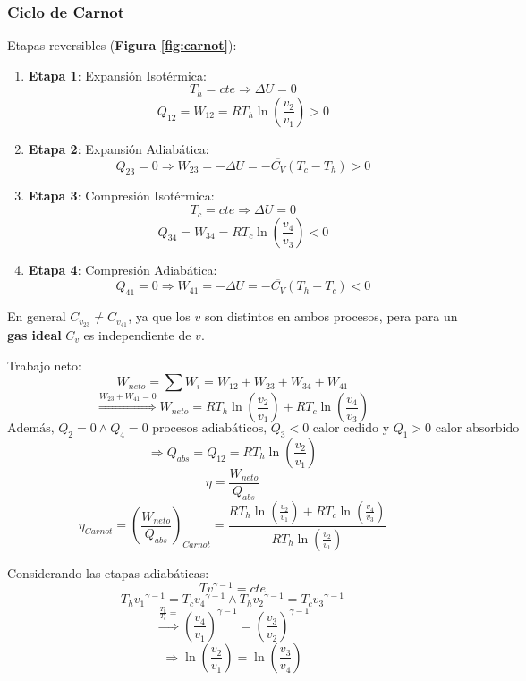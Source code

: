         \subsubsection{Ciclo de Carnot}
        
        Etapas reversibles (\textbf{Figura \ref{fig:carnot}}):
        
        \begin{enumerate}
            \item \textbf{Etapa 1}: Expansión Isotérmica:
                \[T_{h}=cte \Rightarrow \Delta U = 0\]
                \[Q_{12}=W_{12}=RT_{h} \ln(\frac{v_{2}}{v_{1}})>0\]
            \item \textbf{Etapa 2}: Expansión Adiabática:
                \[Q_{23}=0 \Rightarrow W_{23}=-\Delta U=-\overline{C_{V}}(T_{c}-T_{h})>0\]
            \item \textbf{Etapa 3}: Compresión Isotérmica:
                \[T_{c}=cte \Rightarrow \Delta U = 0\]
                \[Q_{34}=W_{34}=RT_{c} \ln(\frac{v_{4}}{v_{3}})<0\]
            \item \textbf{Etapa 4}: Compresión Adiabática:
                \[Q_{41}=0 \Rightarrow W_{41}=-\Delta U=-\overline{C_{V}}(T_{h}-T_{c})<0\]
        \end{enumerate}
        
        En general \(C_{v_{23}} \neq C_{v_{41}}\), ya que los \(v\) son distintos en ambos procesos, pera para un \textbf{gas ideal} \(C_{v}\) es independiente de \(v\).
        
        Trabajo neto:
        \[W_{neto}=\sum W_{i}=W_{12}+W_{23}+W_{34}+W_{41}\]
        \[\overset{W_{23}+W_{41}=0}{\Rightarrow} W_{neto}=RT_{h} \ln(\frac{v_{2}}{v_{1}})+RT_{c} \ln(\frac{v_{4}}{v_{3}})\]
        \[\text{Además, }Q_{2}=0 \wedge Q_{4}=0 \text{ procesos adiabáticos, }Q_{3}<0\text{ calor cedido y }Q_{1}>0\text{ calor absorbido}\]
        \[\Rightarrow Q_{abs}=Q_{12}=RT_{h} \ln(\frac{v_{2}}{v_{1}})\]
        \[\eta = \frac{W_{neto}}{Q_{abs}}\]
        \begin{equation}
        \label{primer_eta}
            \eta_{Carnot} = \left ( \frac{W_{neto}}{Q_{abs}} \right )_{Carnot}=\frac{RT_{h} \ln(\frac{v_{2}}{v_{1}})+RT_{c} \ln(\frac{v_{4}}{v_{3}})}{RT_{h} \ln(\frac{v_{2}}{v_{1}})}
        \end{equation}
        
        Considerando las etapas adiabáticas:
        \[Tv^{\gamma -1}=cte\]
        \[T_{h}{v_{1}}^{\gamma -1}=T_{c}{v_{4}}^{\gamma -1} \wedge T_{h}{v_{2}}^{\gamma -1}=T_{c}{v_{3}}^{\gamma -1}\]
        \[\overset{\frac{T_{h}}{T_{c}}=}{\Rightarrow} \left ( \frac{v_{4}}{v_{1}} \right )^{\gamma -1}=\left ( \frac{v_{3}}{v_{2}} \right )^{\gamma -1}\]
        \begin{equation}
        \label{carnot_adiabatico}
            \Rightarrow \ln(\frac{v_{2}}{v_{1}}) = \ln(\frac{v_{3}}{v_{4}})
        \end{equation}
        
